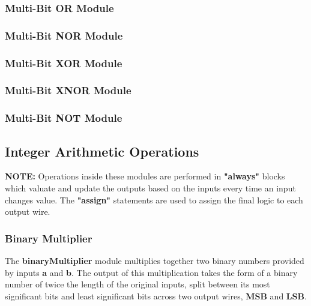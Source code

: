 \documentclass[12pt]{article}
\begin{document}
\subsubsection{Multi-Bit OR Module}


\subsubsection{Multi-Bit NOR Module}


\subsubsection{Multi-Bit XOR Module}


\subsubsection{Multi-Bit XNOR Module}


\subsubsection{Multi-Bit NOT Module}




\newpage



\subsection{Integer Arithmetic Operations}
\textbf{NOTE:} Operations inside these modules are performed in \textbf{"always"} blocks which 
valuate and update the outputs based on the inputs every time an input changes value. 
The \textbf{"assign"} statements are used to assign the final logic to each output wire. \\

\subsubsection{Binary Multiplier}
The \textbf{binaryMultiplier} module multiplies together two binary numbers provided by inputs \textbf{a} and \textbf{b}. 
The output of this multiplication takes the form of a binary number of twice the length of the original inputs, 
split between its most significant bits and least significant bits across two output wires, \textbf{MSB} and \textbf{LSB}.

\end{document}
